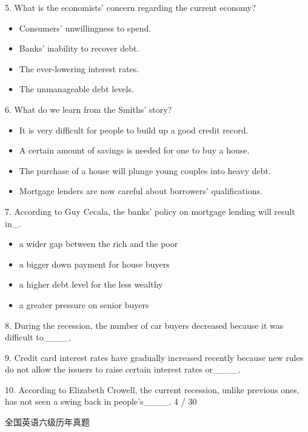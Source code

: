 \documentclass[UTF8,11pt]{ctexart}
\begin{document}
5. What is the economists' concern regarding the current economy?


\begin{itemize}[leftmargin=2em,itemsep=.2em,topsep=.4em]\item[A.] Consumers' unwillingness to spend.
\item[B.] Banks' inability to recover debt.
\item[C.] The ever-lowering interest rates.
\item[D.] The unmanageable debt levels.
\end{itemize}

6. What do we learn from the Smiths' story?


\begin{itemize}[leftmargin=2em,itemsep=.2em,topsep=.4em]\item[A.] It is very difficult for people to build up a good credit record.
\item[B.] A certain amount of savings is needed for one to buy a house.
\item[C.] The purchase of a house will plunge young couples into heavy debt.
\item[D.] Mortgage lenders are now careful about borrowers' qualifications.
\end{itemize}

7. According to Guy Cecala, the banks' policy on mortgage lending will result in\_.


\begin{itemize}[leftmargin=2em,itemsep=.2em,topsep=.4em]\item[A.] a wider gap between the rich and the poor
\item[B.] a bigger down payment for house buyers
\item[C.] a higher debt level for the less wealthy
\item[D.] a greater pressure on senior buyers
\end{itemize}

8. During the recession, the number of car buyers decreased because it was difficult to\_\_\_\_.


9. Credit card interest rates have gradually increased recently because new rules do not allow the issuers to raise certain interest rates or\_\_\_\_.


10. According to Elizabeth Crowell, the current recession, unlike previous ones, has not seen a swing back in people's\_\_\_\_. 4 / 30


全国英语六级历年真题
\end{document}
